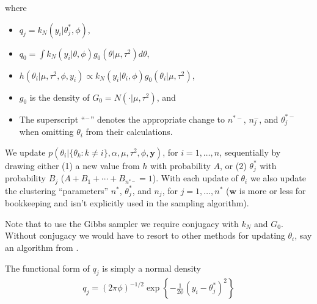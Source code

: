 \documentclass[12pt]{article}
\newcommand{\m}[1]{\mathbf{\bm{#1}}}
\begin{document}
\noindent where
\begin{itemize}[label=$\cdot$]
\item $q_j=k_N(y_i|\theta_j^*,\phi)$,
\item $q_0=\int k_N(y_i|\theta,\phi)g_0(\theta|\mu,\tau^2)d\theta$,
\item $h(\theta_i|\mu,\tau^2,\phi,y_i) \propto k_N(y_i|\theta_i,\phi)g_0(\theta_i|\mu,\tau^2)$,
\item $g_0$ is the density of $G_0=N(\cdot|\mu,\tau^2)$, and
\item The superscript ``$^-$'' denotes the appropriate change to $n^{*-}$, $n_j^-$, and $\theta_j^{*-}$ when omitting $\theta_i$ from their calculations.
\end{itemize}

\noindent We update $p(\theta_i|\{\theta_k:k\neq i\},\alpha,\mu,\tau^2,\phi,\m{y})$, for $i=1,\ldots,n$, sequentially by drawing either (1) a new value from $h$ with probability $A$, or (2) $\theta_j^*$ with probability $B_j$ ($A+B_1+\cdots+B_{n^{*-}}=1$). With each update of $\theta_i$ we also update the clustering ``parameters'' $n^*$, $\theta_j^*$, and $n_j$, for $j=1,\ldots,n^*$ ($\m{w}$ is more or less for bookkeeping and isn't explicitly used in the sampling algorithm).

Note that to use the Gibbs sampler we require conjugacy with $k_N$ and $G_0$. Without conjugacy we would have to resort to other methods for updating $\theta_i$, say an algorithm from \cite{neal2000markov}.

The functional form of $q_j$ is simply a normal density
\begin{align*}
q_j = (2\pi\phi)^{-1/2}\exp\left\{-\frac{1}{2\phi}(y_i - \theta_j^*)^2\right\}
\end{align*}
\end{document}
